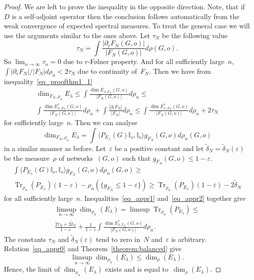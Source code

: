 \documentclass[english]{article}
\theoremstyle{definition}
\DeclareMathOperator{\Tr}{Tr} %
\newcommand*\eps{\varepsilon}
\begin{document}
\begin{proof}
    We are left to prove the inequality in the opposite direction. Note, that if~$D$ is a self-adjoint operator then the conclusion follows automatically from the weak convergence of expected spectral measures. To treat the general case we will use the arguments similar to the ones above. Let $\tau_N$ be the following value 
    $$
    \tau_N =\int \frac{|\partial_r F_N(G,o)|}{|F_N(G,o)|} d \rho (G,o).
    $$
    So $\lim_{n \to \infty} \tau_n = 0$ due to $r$-F\o lner property. And for all sufficiently large~$n$, $\int {|\partial_r F_N|}/{|F_N|} d \rho_n < 2 \tau_N$ due to continuity of~$F_N$. Then we have from inequality~\eqref{eq_proofthm1_1}
    \begin{multline}\label{eq_appr1}
        \dim_{F_N,\rho_n} E_\lambda \le 
        \int \frac{\dim E_{\lambda, F_N}(G,o)}{|F_N(G,o)|} d \rho_n \le \\
        \int \frac{\dim E^*_{\lambda, F_N}(G,o)}{|F_N(G,o)|} d \rho_n + \int \frac{|\partial_r F_N|}{|F_N|} d \rho_n \le \int \frac{\dim E^*_{\lambda, F_N}(G,o)}{|F_N(G,o)|} d \rho_n + 2 \tau_N
    \end{multline}
    for sufficiently large~$n$. Then we can analyse 
    $$
    \dim_{F_N, \rho_n} E_\lambda = \int \langle P_{E_\lambda}(G)\mathbb I_o, \mathbb I_o \rangle g_{F_N}(G,o)  d\rho_n(G,o)
    $$
    in a similar manner as before. Let~$\eps$ be a positive constant and let $\tilde \delta_N = \tilde \delta_N (\eps)$ be the measure~$\rho$ of networks~$(G,o)$ such that $g_{F_N}(G,o) \le 1 - \eps$. 
    \begin{multline}\label{eq_appr2}
        \int \langle P_{E_\lambda}(G)\mathbb I_o, \mathbb I_o \rangle g_{F_N}(G,o)  d\rho_n(G,o) \ge \\
        \Tr_{\rho_n}(P_{E_\lambda}) (1 - \eps) - 
        \rho_n\left(\{ g_{F_N} \le 1 - \eps\}\right) \ge \Tr_{\rho_n}(P_{E_\lambda}) (1 - \eps) - 2\tilde\delta_N 
    \end{multline}
    for all sufficiently large~$n$. Inequalities~\eqref{eq_appr1} and~\eqref{eq_appr2} together give
    \begin{multline}
        \limsup_{n \to \infty} \dim_{\rho_n}(E_\lambda)  = \limsup \Tr_{\rho_n}(P_{E_\lambda}) \le \\
        \frac{2\tau_N + 2 \tilde \delta_N}{1 - \eps} + \frac{1}{1 - \eps} \int \frac{\dim E^*_{\lambda, F_N}(G,o)}{|F_N(G,o)|} d \rho_n.
    \end{multline}
    The constants $\tau_N$ and $\tilde\delta_N(\eps)$ tend to zero in~$N$ and~$\eps$ is arbitrary. Relation~\eqref{eq_appr0} and Theorem~\ref{theorem:balanced} give 
    $$
    \limsup_{n \to \infty} \dim_{\rho_n}(E_\lambda) \le \dim_\rho (E_\lambda).
    $$
    Hence, the limit of $\dim_{\rho_n}(E_\lambda)$ exists and is equal to~$\dim_\rho (E_\lambda)$.
\end{proof}
\end{document}

